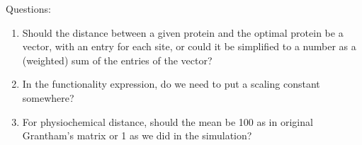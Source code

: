 \documentclass[13pt]{article}
\begin{document}
%
%
%
%

Questions:
\begin{enumerate}
\item Should the distance between a given protein and the optimal protein be a vector, with an entry for each site, or could it be simplified to a number as a (weighted) sum of the entries of the vector?
\item In the functionality expression, do we need to put a scaling constant somewhere?
\item For physiochemical distance, should the mean be 100 as in original Grantham's matrix or 1 as we did in the simulation?
\end{enumerate}
\end{document}
